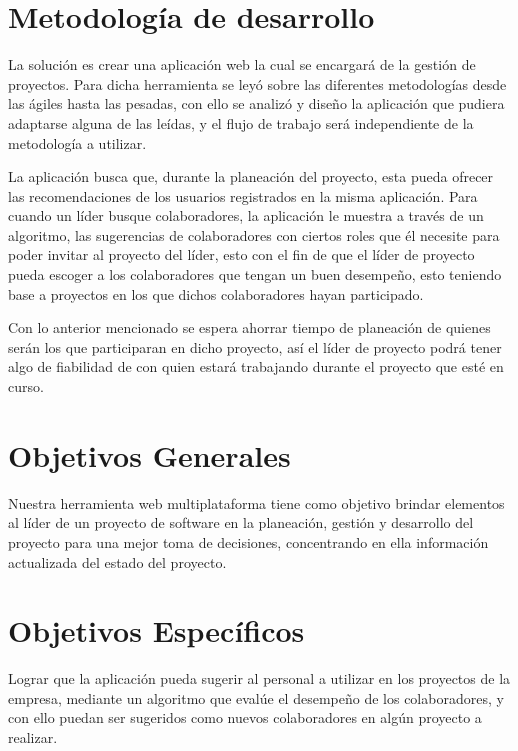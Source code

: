\section{Metodología de desarrollo} 
La solución es crear una aplicación web la cual se encargará de la gestión de proyectos. Para dicha herramienta se leyó sobre las diferentes metodologías desde las ágiles hasta las pesadas, con ello se analizó y diseño la aplicación que pudiera adaptarse alguna de las leídas, y el flujo de trabajo será independiente de la metodología a utilizar. 

 La aplicación busca que, durante la planeación del proyecto, esta pueda ofrecer las recomendaciones de los usuarios registrados en la misma aplicación. Para cuando un líder busque colaboradores, la aplicación le muestra a través de un algoritmo, las sugerencias de colaboradores con ciertos roles que él necesite para poder invitar al proyecto del líder, esto con el fin de que el líder de proyecto pueda escoger a los colaboradores que tengan un buen desempeño, esto teniendo base a proyectos en los que dichos colaboradores hayan participado. 

 Con lo anterior mencionado se espera ahorrar tiempo de planeación de quienes serán los que participaran en dicho proyecto, así el líder de proyecto podrá tener algo de fiabilidad de con quien estará trabajando durante el proyecto que esté en curso. 

\section{Objetivos Generales }

Nuestra herramienta web multiplataforma tiene como objetivo brindar elementos al líder de un proyecto de software en la planeación, gestión y desarrollo del proyecto para una mejor toma de decisiones, concentrando en ella información actualizada del estado del proyecto. 


\section{Objetivos Específicos}

Lograr que la aplicación pueda sugerir al personal a utilizar en los proyectos de la empresa, mediante un algoritmo que evalúe el desempeño de los colaboradores, y con ello puedan ser sugeridos como nuevos colaboradores en algún proyecto a realizar. 


